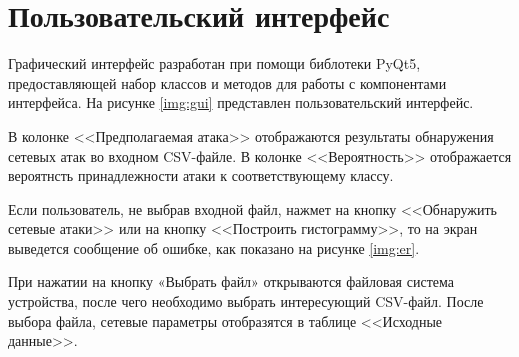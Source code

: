 




\section{Пользовательский интерфейс}
Графический интерфейс разработан при помощи библотеки PyQt5, предоставляющей набор классов и методов для работы с компонентами интерфейса.
На рисунке \ref*{img:gui} представлен пользовательский интерфейс.

В колонке <<Предполагаемая атака>> отображаются результаты обнаружения сетевых атак во входном CSV-файле.
В колонке <<Вероятность>> отображается вероятнсть принадлежности атаки к соответствующему классу.

Если пользователь, не выбрав входной файл, нажмет на кнопку <<Обнаружить сетевые атаки>> или на кнопку <<Построить гистограмму>>,
то на экран выведется сообщение об ошибке, как показано на рисунке \ref*{img:er}.

При нажатии на кнопку «Выбрать файл» открываются файловая система
устройства, после чего необходимо выбрать интересующий CSV-файл.
После выбора файла, сетевые параметры отобразятся в таблице <<Исходные данные>>.

